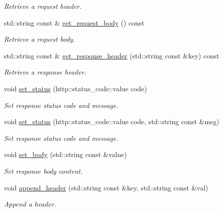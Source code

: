 \begin{DoxyCompactItemize}
\begin{DoxyCompactList}\small\item\em Retrieve a request header. \end{DoxyCompactList}\item 
std\+::string const  \& \hyperlink{classwebsocketpp_1_1connection_a187c640f1352e74a00c0f8b6177da94a}{get\+\_\+request\+\_\+body} () const
\begin{DoxyCompactList}\small\item\em Retrieve a request body. \end{DoxyCompactList}\item 
std\+::string const  \& \hyperlink{classwebsocketpp_1_1connection_a72e0c94609844078fc611716c39791de}{get\+\_\+response\+\_\+header} (std\+::string const \&key) const
\begin{DoxyCompactList}\small\item\em Retrieve a response header. \end{DoxyCompactList}\item 
void \hyperlink{classwebsocketpp_1_1connection_a96d445ff0cc75b854c4500e93a054acb}{set\+\_\+status} (http\+::status\+\_\+code\+::value code)
\begin{DoxyCompactList}\small\item\em Set response status code and message. \end{DoxyCompactList}\item 
void \hyperlink{classwebsocketpp_1_1connection_a97b4513339167df8653a11ef3ccc65b1}{set\+\_\+status} (http\+::status\+\_\+code\+::value code, std\+::string const \&msg)
\begin{DoxyCompactList}\small\item\em Set response status code and message. \end{DoxyCompactList}\item 
void \hyperlink{classwebsocketpp_1_1connection_a40bb318c3b9294018d217d0271a7b3da}{set\+\_\+body} (std\+::string const \&value)
\begin{DoxyCompactList}\small\item\em Set response body content. \end{DoxyCompactList}\item 
void \hyperlink{classwebsocketpp_1_1connection_af8cb78acc61b8a3d59f6162cdba6318b}{append\+\_\+header} (std\+::string const \&key, std\+::string const \&val)
\begin{DoxyCompactList}\small\item\em Append a header. \end{DoxyCompactList}\item 

\end{DoxyCompactItemize}
